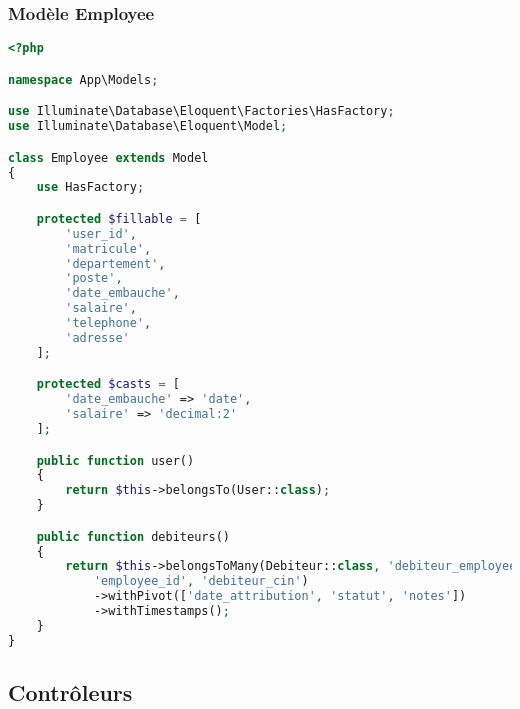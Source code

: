 \documentclass[12pt,a4paper]{report}
\begin{document}
\subsubsection{Modèle Employee}
\begin{lstlisting}[language=PHP]
<?php

namespace App\Models;

use Illuminate\Database\Eloquent\Factories\HasFactory;
use Illuminate\Database\Eloquent\Model;

class Employee extends Model
{
    use HasFactory;

    protected $fillable = [
        'user_id',
        'matricule',
        'departement',
        'poste',
        'date_embauche',
        'salaire',
        'telephone',
        'adresse'
    ];

    protected $casts = [
        'date_embauche' => 'date',
        'salaire' => 'decimal:2'
    ];

    public function user()
    {
        return $this->belongsTo(User::class);
    }

    public function debiteurs()
    {
        return $this->belongsToMany(Debiteur::class, 'debiteur_employee', 
            'employee_id', 'debiteur_cin')
            ->withPivot(['date_attribution', 'statut', 'notes'])
            ->withTimestamps();
    }
}
\end{lstlisting}

\subsection{Contrôleurs}
\end{document}
